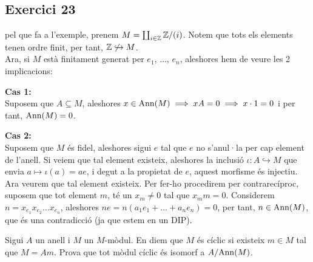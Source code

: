 \documentclass[11pt, a4paper]{article}
\begin{document}
\subsection{Exercici 23}
pel que fa a l'exemple, prenem $M=\coprod_{i \in \mathbb Z} \mathbb Z/(i)$. Notem que tots els elements tenen ordre finit, per tant, $\mathbb Z\not\hookrightarrow M$.\\
Ara, si $M$ està finitament generat per $e_1$, $\dots$, $e_n$, aleshores hem de veure les 2 implicacions:\par
\textbf{Cas 1:}\\
Suposem que $A\subseteq M$, aleshores $x\in\mathrm{Ann}(M)\implies xA=0\implies x\cdot 1=0$ i per tant, $\mathrm{Ann}(M)=0$.\par
\textbf{Cas 2:}\\
Suposem que $M$ és fidel, aleshores sigui $e$ tal que $e$ no s'anul·la per cap element de l'anell. Si veiem que tal element existeix, aleshores la inclusió $\iota:A\hookrightarrow M$ que envia $a\mapsto \iota (a)=ae$, i degut a la propietat de $e$, aquest morfisme és injectiu.\\
Ara veurem que tal element existeix. Per fer-ho procedirem per contrarecíproc, suposem que tot element $m$, té un $x_m\neq0$ tal que $x_mm=0$. Considerem $n=x_{e_1}x_{e_2}\dots x_{e_n}$, aleshores $ne=n(a_1 e_1+\dots +a_ne_n)=0$, per tant, $n\in \mathrm{Ann}(M)$, que és una contradicció (ja que estem en un DIP).
\newpage
\begin{tcolorbox}[title=\section{Exercici 24}]
    Sigui $A$ un anell i $M$ un $M$-mòdul. En diem que $M$ és cíclic si existeix $m\in M$ tal que $M=Am$. Prova que tot mòdul cíclic és isomorf a $A/\mathrm{Ann}(M)$.
\end{tcolorbox}
\end{document}
